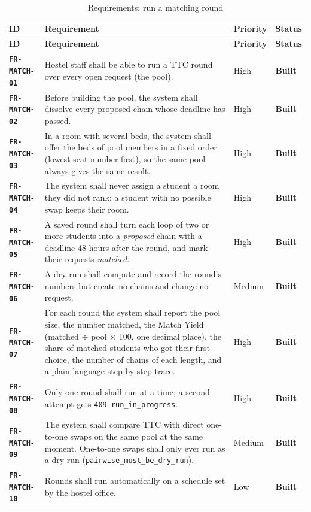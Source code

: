 \documentclass[11pt,a4paper,parskip=half,toc=listof]{scrreprt}
\newcommand{\Built}{\textcolor{builtgreen}{\textbf{Built}}}
\newcommand{\Req}[1]{\textbf{\texttt{#1}}}
\newcommand{\ReqHeader}{%
  \toprule
  \textbf{ID} & \textbf{Requirement} & \textbf{Priority} & \textbf{Status}\\
  \midrule}
\begin{document}
\begin{xltabular}{\linewidth}{@{}L{2.25cm}YL{1.55cm}L{1.6cm}@{}}
  \caption{Requirements: run a matching round}\label{tab:fr-match}\\
  \ReqHeader
  \endfirsthead
  \ReqHeader
  \endhead
  \bottomrule
  \endlastfoot
  \Req{FR-MATCH-01} & Hostel staff shall be able to run a TTC round over
    every open request (the pool). & High & \Built\\
  \Req{FR-MATCH-02} & Before building the pool, the system shall dissolve
    every proposed chain whose deadline has passed. & High & \Built\\
  \Req{FR-MATCH-03} & In a room with several beds, the system shall offer
    the beds of pool members in a fixed order (lowest seat number first),
    so the same pool always gives the same result. & High & \Built\\
  \Req{FR-MATCH-04} & The system shall never assign a student a room they
    did not rank; a student with no possible swap keeps their room. & High
    & \Built\\
  \Req{FR-MATCH-05} & A saved round shall turn each loop of two or more
    students into a \emph{proposed} chain with a deadline 48 hours after
    the round, and mark their requests \emph{matched}. & High & \Built\\
  \Req{FR-MATCH-06} & A dry run shall compute and record the round's
    numbers but create no chains and change no request. & Medium &
    \Built\\
  \Req{FR-MATCH-07} & For each round the system shall report the pool size,
    the number matched, the Match Yield (matched $\div$ pool $\times$ 100,
    one decimal place), the share of matched students who got their first
    choice, the number of chains of each length, and a plain-language
    step-by-step trace. & High & \Built\\
  \Req{FR-MATCH-08} & Only one round shall run at a time; a second attempt
    gets \texttt{409 run\_in\_progress}. & High & \Built\\
  \Req{FR-MATCH-09} & The system shall compare TTC with direct one-to-one
    swaps on the same pool at the same moment. One-to-one swaps shall only
    ever run as a dry run (\texttt{pairwise\_must\_be\_dry\_run}). & Medium
    & \Built\\
  \Req{FR-MATCH-10} & Rounds shall run automatically on a schedule set by
    the hostel office. & Low & \Built\\
\end{xltabular}
\end{document}
